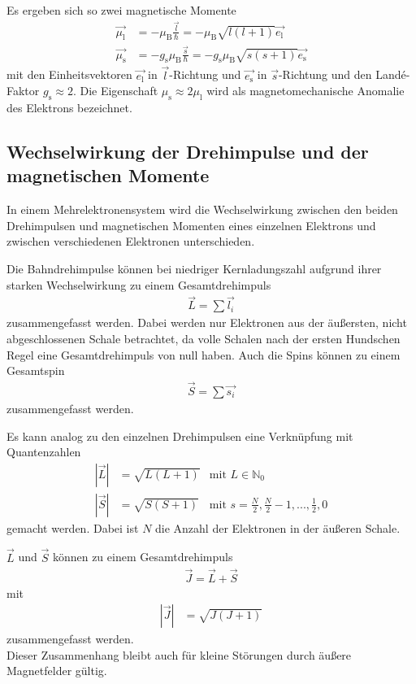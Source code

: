 \documentclass[captions=tableheading]{scrartcl}
\newcommand{\indx}[1]{\text{#1}}
\begin{document}
Es ergeben sich so zwei magnetische Momente
\begin{align}
\vec{\mu_\indx{l}}&=-\mu_\indx{B}\frac{\vec{l}}{\hbar}=-\mu_\indx{B}\sqrt{l\left(l+1\right)}\vec{e_\indx{l}}\\
\vec{\mu_\indx{s}}&=-g_\indx{s}\mu_\indx{B}\frac{\vec{s}}{\hbar}=-g_\indx{s}\mu_\indx{B}\sqrt{s\left(s+1\right)}\vec{e_\indx{s}}
\end{align}
mit den Einheitsvektoren $\vec{e_\indx{l}}$ in $\vec{l}$-Richtung und $\vec{e_\indx{s}}$ in $\vec{s}$-Richtung und den Land\'{e}-Faktor $g_\indx{s}\approx 2$.
Die Eigenschaft $\mu_\indx{s}\approx 2\mu_\indx{l}$ wird als magnetomechanische Anomalie des Elektrons bezeichnet.
\subsection{Wechselwirkung der Drehimpulse und der magnetischen Momente}
In einem Mehrelektronensystem wird die Wechselwirkung zwischen den beiden Drehimpulsen und magnetischen Momenten eines einzelnen Elektrons und zwischen verschiedenen Elektronen unterschieden.

Die Bahndrehimpulse können bei niedriger Kernladungszahl aufgrund ihrer starken Wechselwirkung zu einem Gesamtdrehimpuls
\begin{align}
\vec{L}=\sum \vec{l_i}
\end{align}
zusammengefasst werden.
Dabei werden nur Elektronen aus der äußersten, nicht abgeschlossenen Schale betrachtet, da volle Schalen nach der ersten Hundschen Regel eine Gesamtdrehimpuls von null haben.
Auch die Spins können zu einem Gesamtspin
\begin{align}
\vec{S}=\sum \vec{s_i}
\end{align}
zusammengefasst werden.

Es kann analog zu den einzelnen Drehimpulsen eine Verknüpfung mit Quantenzahlen
\begin{align}
\left| \vec{L} \right| &= \sqrt{L\left(L+1\right)} &  \text{mit } L\in \mathbb{N}_{0}\\
\left| \vec{S} \right| &= \sqrt{S\left(S+1\right)} &  \text{mit }  s=\frac{N}{2},\frac{N}{2}-1,...,\frac{1}{2}, 0
\end{align}
gemacht werden. 
Dabei ist $N$ die Anzahl der Elektronen in der äußeren Schale.

$\vec{L}$ und $\vec{S}$ können zu einem Gesamtdrehimpuls
\begin{align}
\vec{J}=\vec{L}+\vec{S}
\end{align}
mit
\begin{align}
\left| \vec{J} \right| &= \sqrt{J\left(J+1\right)}
\end{align}
zusammengefasst werden. \\
Dieser Zusammenhang bleibt auch für kleine Störungen durch äußere Magnetfelder gültig.
\end{document}
